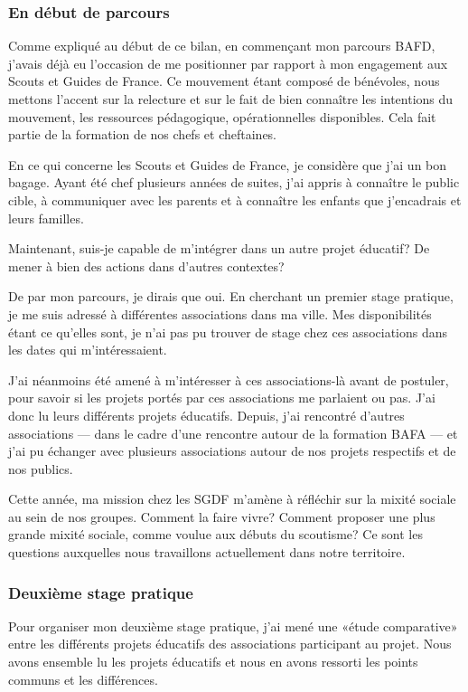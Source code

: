 \documentclass[titlepage,11pt,a4paper]{article}
\begin{document}
\subsubsection{En début de parcours}

Comme expliqué au début de ce bilan, en commençant mon parcours BAFD, j'avais déjà eu
l'occasion de me positionner par rapport à mon engagement aux Scouts et Guides de France.
Ce mouvement étant composé de bénévoles, nous mettons l'accent sur la relecture et sur le
fait de bien connaître les intentions du mouvement, les ressources pédagogique,
opérationnelles disponibles. Cela fait partie de la formation de nos chefs et cheftaines.

En ce qui concerne les Scouts et Guides de France, je considère que j'ai un bon bagage.
Ayant été chef plusieurs années de suites, j'ai appris à connaître le public cible, à
communiquer avec les parents et à connaître les enfants que j'encadrais et leurs familles.

Maintenant, suis-je capable de m'intégrer dans un autre projet éducatif? De mener à bien
des actions dans d'autres contextes?

De par mon parcours, je dirais que oui. En cherchant un premier stage pratique, je me suis
adressé à différentes associations dans ma ville. Mes disponibilités étant ce qu'elles
sont, je n'ai pas pu trouver de stage chez ces associations dans les dates qui m'intéressaient.

J'ai néanmoins été amené à m'intéresser à ces associations-là avant de postuler, pour
savoir si les projets portés par ces associations me parlaient ou pas. J'ai donc lu leurs
différents projets éducatifs. Depuis, j'ai rencontré d'autres associations --- dans le cadre
d'une rencontre autour de la formation BAFA --- et j'ai pu échanger avec plusieurs
associations autour de nos projets respectifs et de nos publics.

Cette année, ma mission chez les SGDF m'amène à réfléchir sur la mixité sociale au sein de
nos groupes. Comment la faire vivre? Comment proposer une plus grande mixité sociale,
comme voulue aux débuts du scoutisme? Ce sont les questions auxquelles nous travaillons
actuellement dans notre territoire.

\subsubsection{Deuxième stage pratique}

Pour organiser mon deuxième stage pratique, j'ai mené une «étude comparative» entre les
différents projets éducatifs des associations participant au projet. Nous avons ensemble
lu les projets éducatifs et nous en avons ressorti les points communs et les différences.
\end{document}
